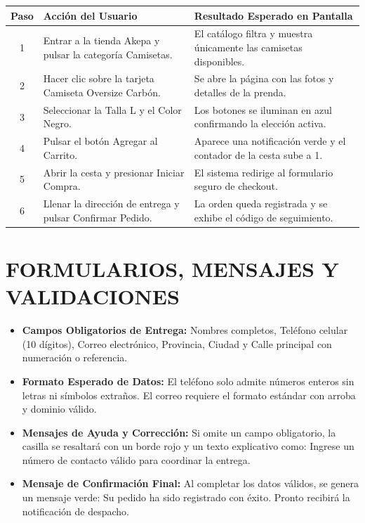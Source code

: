 \documentclass[12pt]{article}
\begin{document}
\begin{table}[H]
\centering
\small
\renewcommand{\arraystretch}{1.3}
\begin{tabularx}{\textwidth}{|c|p{}|X|}
\hline
\textbf{Paso} & \textbf{Acción del Usuario} & \textbf{Resultado Esperado en Pantalla} \\ \hline
1 & Entrar a la tienda Akepa y pulsar la categoría Camisetas. & El catálogo filtra y muestra únicamente las camisetas disponibles. \\ \hline
2 & Hacer clic sobre la tarjeta Camiseta Oversize Carbón. & Se abre la página con las fotos y detalles de la prenda. \\ \hline
3 & Seleccionar la Talla L y el Color Negro. & Los botones se iluminan en azul confirmando la elección activa. \\ \hline
4 & Pulsar el botón Agregar al Carrito. & Aparece una notificación verde y el contador de la cesta sube a 1. \\ \hline
5 & Abrir la cesta y presionar Iniciar Compra. & El sistema redirige al formulario seguro de checkout. \\ \hline
6 & Llenar la dirección de entrega y pulsar Confirmar Pedido. & La orden queda registrada y se exhibe el código de seguimiento. \\ \hline
\end{tabularx}
\end{table}

\section*{FORMULARIOS, MENSAJES Y VALIDACIONES}
\begin{itemize}
    \item \textbf{Campos Obligatorios de Entrega:} Nombres completos, Teléfono celular (10 dígitos), Correo electrónico, Provincia, Ciudad y Calle principal con numeración o referencia.
    \item \textbf{Formato Esperado de Datos:} El teléfono solo admite números enteros sin letras ni símbolos extraños. El correo requiere el formato estándar con arroba y dominio válido.
    \item \textbf{Mensajes de Ayuda y Corrección:} Si omite un campo obligatorio, la casilla se resaltará con un borde rojo y un texto explicativo como: Ingrese un número de contacto válido para coordinar la entrega.
    \item \textbf{Mensaje de Confirmación Final:} Al completar los datos válidos, se genera un mensaje verde: Su pedido ha sido registrado con éxito. Pronto recibirá la notificación de despacho.
\end{itemize}
\end{document}
